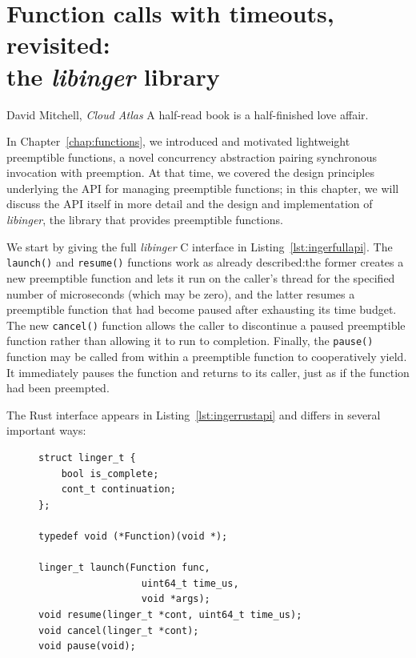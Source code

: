 \chapter{Function calls with timeouts, revisited: \\ the \textit{libinger} library}
\label{chap:libinger}

\ifdefined\chapquotes
\vspace{-0.5in}
\begin{chapquote}[1.5in]{David Mitchell, \textit{Cloud Atlas}}
A half-read book is a half-finished love affair.
\end{chapquote}
\fi

In Chapter~\ref{chap:functions}, we introduced and motivated lightweight preemptible
functions, a novel concurrency abstraction pairing synchronous invocation with
preemption.  At that time, we covered the design principles underlying the API for
managing preemptible functions; in this chapter, we will discuss the API itself in
more detail and the design and implementation of \textit{libinger}, the library that
provides preemptible functions.

We start by giving the full \textit{libinger} C interface in
Listing~\ref{lst:ingerfullapi}.  The \texttt{launch()} and \texttt{resume()}
functions work as already described:\@ the former creates a new preemptible function
and lets it run on the caller's thread for the specified number of microseconds
(which may be zero), and the latter resumes a preemptible function that had become
paused after exhausting its time budget.  The new \texttt{cancel()} function allows
the caller to discontinue a paused preemptible function rather than allowing it to
run to completion.  Finally, the \texttt{pause()} function may be called from within
a preemptible function to cooperatively yield.  It immediately pauses the function
and returns to its caller, just as if the function had been preempted.

The Rust interface appears in Listing~\ref{lst:ingerrustapi} and differs in several
important ways:

\begin{figure}
\begin{lstlisting}[label=lst:ingerfullapi,caption=Preemptible functions extended C interface,morekeywords=uint64_t]
struct linger_t {
	bool is_complete;
	cont_t continuation;
};

typedef void (*Function)(void *);

linger_t launch(Function func,
                  uint64_t time_us,
                  void *args);
void resume(linger_t *cont, uint64_t time_us);
void cancel(linger_t *cont);
void pause(void);
\end{lstlisting}
\end{figure}

